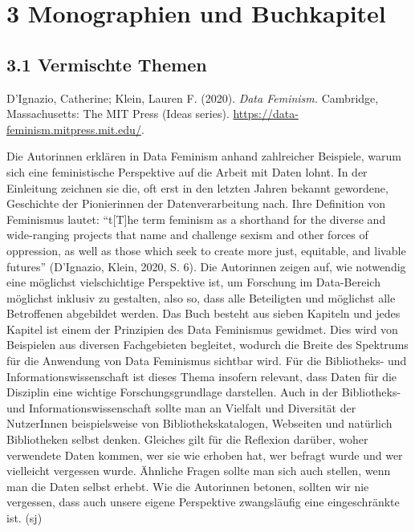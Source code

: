 \documentclass[a4paper,
fontsize=11pt,
oneside,
numbers=noperiodatend,
parskip=half-,
bibliography=totoc,
final
]{scrartcl}
\begin{document}
\hypertarget{monographien-und-buchkapitel}{%
\section{3 Monographien und
Buchkapitel}\label{monographien-und-buchkapitel}}

\hypertarget{vermischte-themen-1}{%
\subsection{3.1 Vermischte Themen}\label{vermischte-themen-1}}

D'Ignazio, Catherine; Klein, Lauren F. (2020). \emph{Data Feminism.}
Cambridge, Massachusetts: The MIT Press (Ideas series).
\url{https://data-feminism.mitpress.mit.edu/}.

Die Autorinnen erklären in Data Feminism anhand zahlreicher Beispiele,
warum sich eine feministische Perspektive auf die Arbeit mit Daten
lohnt. In der Einleitung zeichnen sie die, oft erst in den letzten
Jahren bekannt gewordene, Geschichte der Pionierinnen der
Datenverarbeitung nach. Ihre Definition von Feminismus lautet:
\enquote{t{[}T{]}he term feminism as a shorthand for the diverse and
wide-ranging projects that name and challenge sexism and other forces of
oppression, as well as those which seek to create more just, equitable,
and livable futures} (D'Ignazio, Klein, 2020, S. 6). Die Autorinnen
zeigen auf, wie notwendig eine möglichst vielschichtige Perspektive ist,
um Forschung im Data-Bereich möglichst inklusiv zu gestalten, also so,
dass alle Beteiligten und möglichst alle Betroffenen abgebildet werden.
Das Buch besteht aus sieben Kapiteln und jedes Kapitel ist einem der
Prinzipien des Data Feminismus gewidmet. Dies wird von Beispielen aus
diversen Fachgebieten begleitet, wodurch die Breite des Spektrums für
die Anwendung von Data Feminismus sichtbar wird. Für die Bibliotheks-
und Informationswissenschaft ist dieses Thema insofern relevant, dass
Daten für die Disziplin eine wichtige Forschungsgrundlage darstellen.
Auch in der Bibliotheks- und Informationswissenschaft sollte man an
Vielfalt und Diversität der NutzerInnen beispielsweise von
Bibliothekskatalogen, Webseiten und natürlich Bibliotheken selbst
denken. Gleiches gilt für die Reflexion darüber, woher verwendete Daten
kommen, wer sie wie erhoben hat, wer befragt wurde und wer vielleicht
vergessen wurde. Ähnliche Fragen sollte man sich auch stellen, wenn man
die Daten selbst erhebt. Wie die Autorinnen betonen, sollten wir nie
vergessen, dass auch unsere eigene Perspektive zwangsläufig eine
eingeschränkte ist. (sj)
\end{document}
